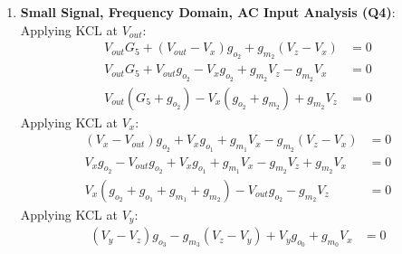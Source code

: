 \begin{enumerate}
\begin{align*}
                              &= \frac{k_{n_1}}{k_{n_0}} \quad \text{[exact for any } K_{CLM} \text{ when } V_Y = V_X \text{]}
    \end{align*}
    \(V_Y = V_X\) requires equal gate-source voltages of \(M_3\) and \(M_2\),
    since \(V_Y = V_Z - V_{GS_3}\) and \(V_X = V_Z - V_{GS_2}\). With
    \(K_{CLM} = 0\) in (7) and (8):
    \begin{align*}
      V_{GS_3} &= V_{GS_2} \\
      V_{th} + \sqrt{\frac{I_{M_3}}{k_{n_3}}} &= V_{th} + \sqrt{\frac{I_{M_2}}{k_{n_2}}} \\
      \frac{I_{M_2}}{I_{M_3}} &= \frac{k_{n_2}}{k_{n_3}} = \frac{W_2 L_3}{L_2 W_3}
    \end{align*}
    Thus, with \(k_n = \frac{K_P}{2}\frac{W}{L}\) and \(M_2\), \(M_3\) sized by the last line,
    \begin{align*}
      \frac{I_{OUT}}{I_{IN}} \approx \frac{I_{M_2}}{I_{M_3}} \approx \frac{I_{M_1}}{I_{M_0}} \approx \frac{k_{n_1}}{k_{n_0}} = \frac{\frac{K_P}{2} \frac{W_1}{L_1}}{\frac{K_P}{2} \frac{W_0}{L_0}} = \frac{\frac{W_1}{L_1}}{\frac{W_0}{L_0}} = \frac{W_1 L_0}{L_1 W_0} = \frac{W_2 L_3}{L_2 W_3}
    \end{align*}
  \item \textbf{Small Signal, Frequency Domain, AC Input Analysis (Q4)}:\\
    Applying KCL at $V_{out}$:
    \begin{align*}
      V_{out}G_5 + (V_{out} - V_{x})g_{o_2} + g_{m_2}(V_{z} - V_{x}) &= 0 \\
      V_{out}G_5 + V_{out}g_{o_2} - V_{x}g_{o_2} + g_{m_2}V_{z} - g_{m_2}V_{x} &= 0 \\
      V_{out}(G_5 + g_{o_2}) - V_{x}(g_{o_2} + g_{m_2}) + g_{m_2}V_{z} &= 0 \tag{9}
    \end{align*}
    Applying KCL at $V_{x}$:
    \begin{align*}
      (V_{x} - V_{out})g_{o_2} + V_{x}g_{o_1} + g_{m_1}V_{x} - g_{m_2}(V_{z} - V_{x}) &= 0 \\
      V_{x}g_{o_2} - V_{out}g_{o_2} + V_{x}g_{o_1} + g_{m_1}V_{x} - g_{m_2}V_{z} + g_{m_2}V_{x} &= 0 \\
      V_{x}(g_{o_2} + g_{o_1} + g_{m_1} + g_{m_2}) - V_{out}g_{o_2} - g_{m_2}V_{z} &= 0 \tag{10}
    \end{align*}
    Applying KCL at $V_{y}$:
    \begin{align*}
      (V_{y} - V_{z})g_{o_3} - g_{m_3}(V_{z} - V_{y}) + V_{y}g_{o_0} + g_{m_0}V_{x} &= 0 \\

\end{align*}
\end{enumerate}
